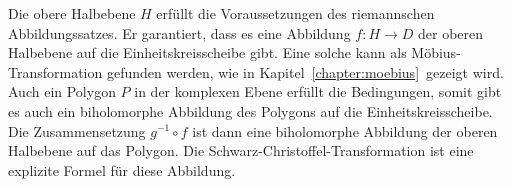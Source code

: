 Die obere Halbebene $H$ erfüllt die Voraussetzungen des riemannschen
Abbildungssatzes.
Er garantiert, dass es eine Abbildung $f\colon H\to D$ der oberen
Halbebene auf die Einheitskreisscheibe gibt.
Eine solche kann als Möbius-Transformation gefunden werden, wie in
Kapitel~\ref{chapter:moebius} gezeigt wird.
Auch ein Polygon $P$ in der komplexen Ebene erfüllt die Bedingungen,
somit gibt es auch ein biholomorphe Abbildung des Polygons auf die
Einheitskreisscheibe.
Die Zusammensetzung $g^{-1}\circ f$ ist dann eine biholomorphe Abbildung
der oberen Halbebene auf das Polygon.
Die Schwarz-Christoffel-Transformation ist eine explizite Formel
für diese Abbildung.
